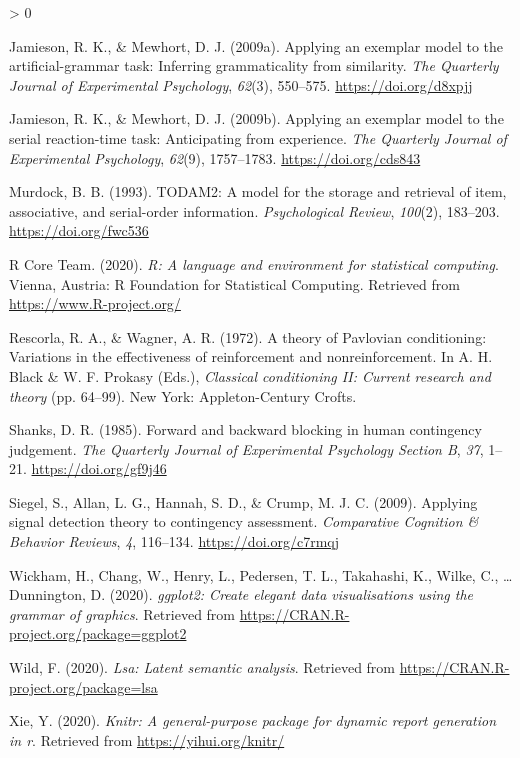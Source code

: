 \documentclass[
  english,
  man,floatsintext]{apa6}
\newlength{\cslhangindent}
\newenvironment{CSLReferences}[2] %
 {%
  \setlength{\parindent}{0pt}
  \ifodd #1 \everypar{\setlength{\hangindent}{\cslhangindent}}\ignorespaces\fi
  \ifnum #2 > 0
  \setlength{\parskip}{#2\baselineskip}
  \fi
 }%
 {}
\begin{document}
\begin{CSLReferences}{1}{0}
\leavevmode\hypertarget{ref-jamiesonApplyingExemplarModel2009}{}%
Jamieson, R. K., \& Mewhort, D. J. (2009a). Applying an exemplar model to the artificial-grammar task: {Inferring} grammaticality from similarity. \emph{The Quarterly Journal of Experimental Psychology}, \emph{62}(3), 550--575. \url{https://doi.org/d8xpjj}

\leavevmode\hypertarget{ref-jamiesonApplyingExemplarModel2009a}{}%
Jamieson, R. K., \& Mewhort, D. J. (2009b). Applying an exemplar model to the serial reaction-time task: {Anticipating} from experience. \emph{The Quarterly Journal of Experimental Psychology}, \emph{62}(9), 1757--1783. \url{https://doi.org/cds843}

\leavevmode\hypertarget{ref-murdockTODAM2ModelStorage1993}{}%
Murdock, B. B. (1993). {TODAM2}: A model for the storage and retrieval of item, associative, and serial-order information. \emph{Psychological Review}, \emph{100}(2), 183--203. \url{https://doi.org/fwc536}

\leavevmode\hypertarget{ref-R-base}{}%
R Core Team. (2020). \emph{R: A language and environment for statistical computing}. Vienna, Austria: R Foundation for Statistical Computing. Retrieved from \url{https://www.R-project.org/}

\leavevmode\hypertarget{ref-rescorlaTheoryPavlovianConditioning1972}{}%
Rescorla, R. A., \& Wagner, A. R. (1972). A theory of {Pavlovian} conditioning: {Variations} in the effectiveness of reinforcement and nonreinforcement. In A. H. Black \& W. F. Prokasy (Eds.), \emph{Classical conditioning {II}: {Current} research and theory} (pp. 64--99). {New York: Appleton-Century Crofts}.

\leavevmode\hypertarget{ref-shanksForwardBackwardBlocking1985}{}%
Shanks, D. R. (1985). Forward and backward blocking in human contingency judgement. \emph{The Quarterly Journal of Experimental Psychology Section B}, \emph{37}, 1--21. \url{https://doi.org/gf9j46}

\leavevmode\hypertarget{ref-siegelApplyingSignalDetection2009}{}%
Siegel, S., Allan, L. G., Hannah, S. D., \& Crump, M. J. C. (2009). Applying signal detection theory to contingency assessment. \emph{Comparative Cognition \& Behavior Reviews}, \emph{4}, 116--134. \url{https://doi.org/c7rmqj}

\leavevmode\hypertarget{ref-R-ggplot2}{}%
Wickham, H., Chang, W., Henry, L., Pedersen, T. L., Takahashi, K., Wilke, C., \ldots{} Dunnington, D. (2020). \emph{ggplot2: Create elegant data visualisations using the grammar of graphics}. Retrieved from \url{https://CRAN.R-project.org/package=ggplot2}

\leavevmode\hypertarget{ref-R-lsa}{}%
Wild, F. (2020). \emph{Lsa: Latent semantic analysis}. Retrieved from \url{https://CRAN.R-project.org/package=lsa}

\leavevmode\hypertarget{ref-R-knitr}{}%
Xie, Y. (2020). \emph{Knitr: A general-purpose package for dynamic report generation in r}. Retrieved from \url{https://yihui.org/knitr/}

\end{CSLReferences}
\end{document}
